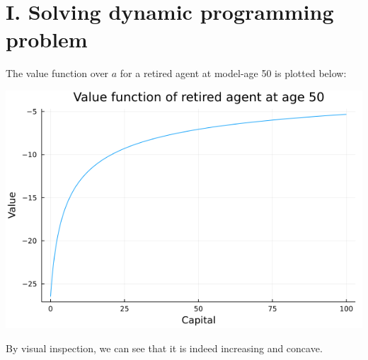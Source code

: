 \documentclass[12pt]{article}
\begin{document}
\section{I. Solving dynamic programming problem}
The value function over $a$ for a retired agent at model-age 50 is plotted below:
\begin{center}
    \includegraphics[scale=0.5]{vfplot50.png}
\end{center}
By visual inspection, we can see that it is indeed increasing and concave.
\end{document}

